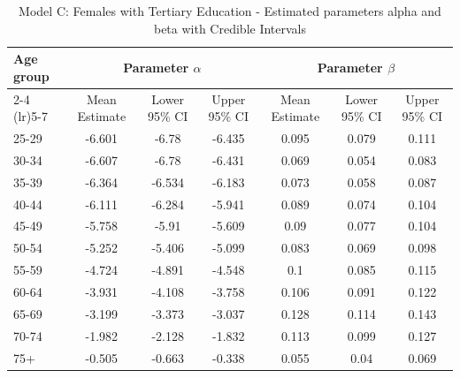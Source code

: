 \begin{landscape}
\begin{table}[htbp]
\centering
\caption{Model C: Females with Tertiary Education - Estimated parameters alpha and beta  with Credible Intervals}
\label{tab:parameters_ab20}
\begin{tabular}{@{}lcccccc@{}}
\toprule
Age group & \multicolumn{3}{c}{Parameter \(\alpha\)} & \multicolumn{3}{c}{Parameter \(\beta\)} \\ 
\cmidrule(lr){2-4} \cmidrule(lr){5-7}
          & Mean Estimate & Lower 95\% CI & Upper 95\% CI & Mean Estimate & Lower 95\% CI & Upper 95\% CI \\ 
\midrule
25-29 & -6.601 & -6.78 & -6.435 & 0.095 & 0.079 & 0.111 \\
30-34 & -6.607 & -6.78 & -6.431 & 0.069 & 0.054 & 0.083 \\
35-39 & -6.364 & -6.534 & -6.183 & 0.073 & 0.058 & 0.087 \\
40-44 & -6.111 & -6.284 & -5.941 & 0.089 & 0.074 & 0.104 \\
45-49 & -5.758 & -5.91 & -5.609 & 0.09 & 0.077 & 0.104 \\
50-54 & -5.252 & -5.406 & -5.099 & 0.083 & 0.069 & 0.098 \\
55-59 & -4.724 & -4.891 & -4.548 & 0.1 & 0.085 & 0.115 \\
60-64 & -3.931 & -4.108 & -3.758 & 0.106 & 0.091 & 0.122 \\
65-69 & -3.199 & -3.373 & -3.037 & 0.128 & 0.114 & 0.143 \\
70-74 & -1.982 & -2.128 & -1.832 & 0.113 & 0.099 & 0.127 \\
75+ & -0.505 & -0.663 & -0.338 & 0.055 & 0.04 & 0.069 \\
\bottomrule
\end{tabular}
\end{table}
\end{landscape}